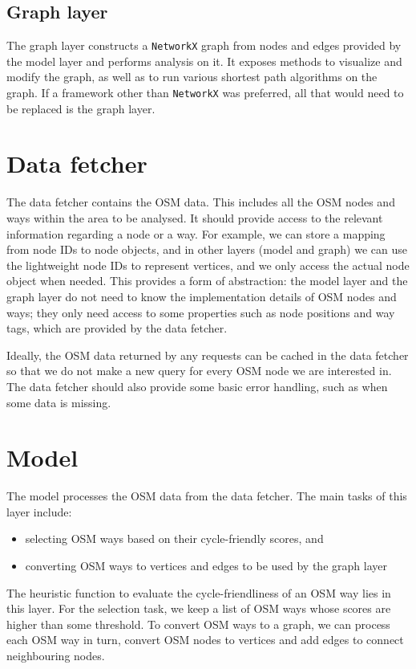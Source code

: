 \documentclass[12pt,a4paper]{report}
\begin{document}
\subsection{Graph layer}
The graph layer constructs a \texttt{NetworkX} graph from nodes and edges provided by the model layer and performs analysis on it. It exposes methods to visualize and modify the graph, as well as to run various shortest path algorithms on the graph. If a framework other than \texttt{NetworkX} was preferred, all that would need to be replaced is the graph layer.

\section{Data fetcher}
The data fetcher contains the OSM data. This includes all the OSM nodes and ways within the area to be analysed. It should provide access to the relevant information regarding a node or a way. For example, we can store a mapping from node IDs to node objects, and in other layers (model and graph) we can use the lightweight node IDs to represent vertices, and we only access the actual node object when needed. This provides a form of abstraction: the model layer and the graph layer do not need to know the implementation details of OSM nodes and ways; they only need access to some properties such as node positions and way tags, which are provided by the data fetcher.

Ideally, the OSM data returned by any requests can be cached in the data fetcher so that we do not make a new query for every OSM node we are interested in. The data fetcher should also provide some basic error handling, such as when some data is missing.

\section{Model}
The model processes the OSM data from the data fetcher. The main tasks of this layer include:
\begin{itemize}
    \item selecting OSM ways based on their cycle-friendly scores, and
    \item converting OSM ways to vertices and edges to be used by the graph layer
\end{itemize}

The heuristic function to evaluate the cycle-friendliness of an OSM way lies in this layer. For the selection task, we keep a list of OSM ways whose scores are higher than some threshold. To convert OSM ways to a graph, we can process each OSM way in turn, convert OSM nodes to vertices and add edges to connect neighbouring nodes.
\end{document}
